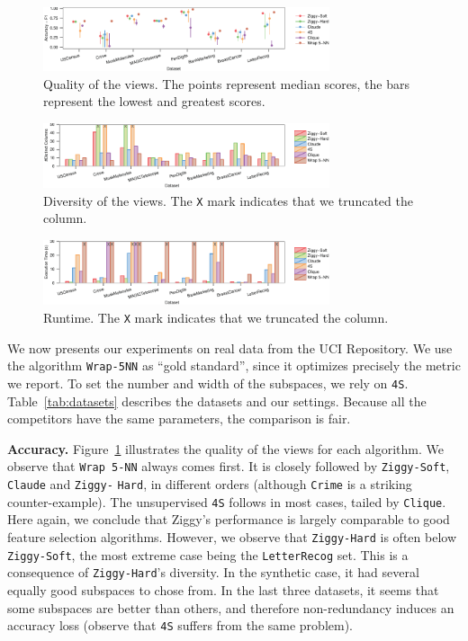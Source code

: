 \begin{figure}[!ht]
  \centering
  \includegraphics[width=0.75\textwidth]{Plots/Real-Accuracy}
  \caption{Quality of the views. The points represent median scores, the bars
  represent the lowest and greatest scores.}
  \label{pic:realquali}
\end{figure}
\begin{figure}[!ht]
  \centering
  \includegraphics[width=0.75\textwidth]{Plots/Real-Diversity}
  \caption{Diversity of the views. The \texttt{X} mark indicates that we 
  truncated the column.}
  \label{pic:realdiversity}
\end{figure}
\begin{figure}[!ht]
  \centering
  \includegraphics[width=0.75\textwidth]{Plots/Real-Runtime}
  \caption{Runtime. The \texttt{X} mark indicates that we truncated the column.}
  \label{pic:realruntime}
\end{figure}
We now presents our experiments on real data from the UCI Repository. We
use the algorithm \texttt{Wrap-5NN} as ``gold standard'',
since it optimizes precisely the metric we report. To set the number and width
of the subspaces, we rely on \texttt{4S}. Table~\ref{tab:datasets} describes the
datasets and our settings. Because all the competitors have the same
parameters, the comparison is fair.

\textbf{Accuracy.} Figure~\ref{pic:realquali} illustrates the quality of the
views for each algorithm. We observe that \texttt{Wrap 5-NN} always comes
first. It is closely followed by \texttt{Ziggy-Soft}, \texttt{Claude} and
\texttt{Ziggy-} \texttt{Hard},  in different orders (although \texttt{Crime} is a
striking counter-example). The unsupervised \texttt{4S} follows in most cases,
tailed by \texttt{Clique}. Here again, we conclude that Ziggy's performance is
largely comparable to good feature selection algorithms. However, we observe
that \texttt{Ziggy-Hard} is often below \texttt{Ziggy-Soft}, the most extreme
case being the \texttt{LetterRecog} set.  This is a consequence of
\texttt{Ziggy-Hard}'s diversity. In the synthetic case, it had several equally
good subspaces to chose from. In the last three datasets, it seems that some
subspaces are better than others, and therefore non-redundancy induces an
accuracy loss (observe that \texttt{4S} suffers from the same problem).

